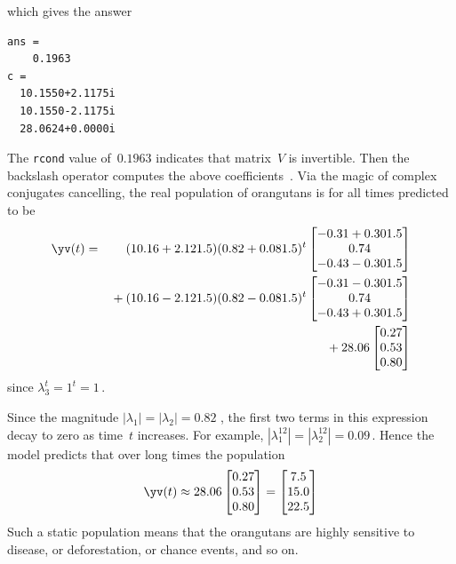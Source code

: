 \begin{example}
\begin{solution}
\begin{itemize}
which gives the answer
\begin{verbatim}
ans =
    0.1963
c =
  10.1550+2.1175i
  10.1550-2.1175i
  28.0624+0.0000i
\end{verbatim}
The \verb|rcond| value of~\(0.1963\) indicates that matrix~\(V\) is invertible.
Then the backslash operator computes the above coefficients~\cv.
Via the magic of complex conjugates cancelling, the real population of orangutans is for all times predicted to be \twodp
\begin{eqnarray*}
\yv(t)&=&(10.16+2.12\i)(0.82+0.08\i)^t\begin{bmatrix} -0.31+0.30\i   \\0.74
\\-0.43-0.30\i \end{bmatrix}
\\&&{}
+(10.16-2.12\i)(0.82-0.08\i)^t\begin{bmatrix} -0.31-0.30\i   \\0.74
\\-0.43+0.30\i \end{bmatrix}
\\&&{}
+28.06\begin{bmatrix} 0.27
\\0.53
\\0.80 \end{bmatrix}
\end{eqnarray*}
since \(\lambda_3^t=1^t=1\)\,.

Since the magnitude \(|\lambda_1|=|\lambda_2|=0.82\) \twodp, 
the first two terms in this expression decay to zero as time~\(t\) increases.
For example, \(|\lambda_1^{12}|=|\lambda_2^{12}|=0.09\)\,.
Hence the model predicts that over long times the population
\begin{equation*}
\yv(t)\approx 28.06\begin{bmatrix} 0.27
\\0.53
\\0.80 \end{bmatrix}
=\begin{bmatrix} 7.5\\15.0\\22.5 \end{bmatrix}
\end{equation*}
Such a static population means that the orangutans are highly sensitive to disease, or deforestation, or chance events, and so on.


\end{itemize}
\end{solution}
\end{example}
